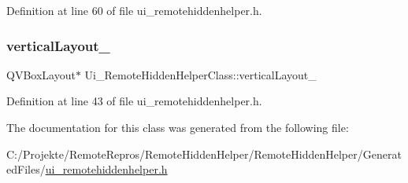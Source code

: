 Definition at line 60 of file ui\+\_\+remotehiddenhelper.\+h.

\hypertarget{class_ui___remote_hidden_helper_class_a47a3e0139bbcce07fe9aa8260b940b3d}{}\label{class_ui___remote_hidden_helper_class_a47a3e0139bbcce07fe9aa8260b940b3d} 
\subsubsection{\texorpdfstring{vertical\+Layout\+\_}{verticalLayout\_4}}
{\footnotesize\ttfamily Q\+V\+Box\+Layout$\ast$ Ui\+\_\+\+Remote\+Hidden\+Helper\+Class\+::vertical\+Layout\+\_}



Definition at line 43 of file ui\+\_\+remotehiddenhelper.\+h.



The documentation for this class was generated from the following file\+:\begin{DoxyCompactItemize}
\item 
C\+:/\+Projekte/\+Remote\+Repros/\+Remote\+Hidden\+Helper/\+Remote\+Hidden\+Helper/\+Generated\+Files/\hyperlink{ui__remotehiddenhelper_8h}{ui\+\_\+remotehiddenhelper.\+h}\end{DoxyCompactItemize}
